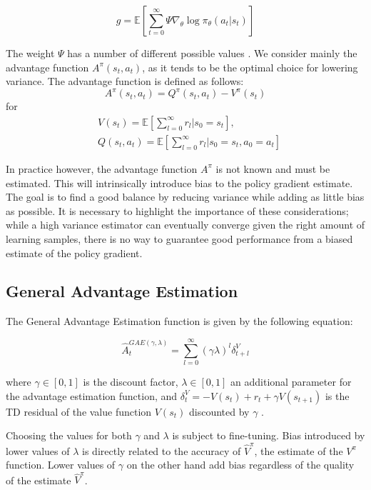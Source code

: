 \[
g = \mathbb{E}\left[\sum_{t=0}^{\infty} \Psi \nabla_{\theta}\log\pi_{\theta}(a_t|s_t)\right]
\]

The weight $\Psi$ has a number of different possible values \cite{schulman2015highdimensional}. We consider mainly the advantage function $A^\pi(s_t, a_t)$, as it tends to be the optimal choice for lowering variance. The advantage function is defined as follows:
\begin{equation}
A^\pi(s_t,a_t) = Q^\pi(s_t, a_t) - V^\pi(s_t)
\end{equation}
for
\begin{align*}
&V(s_t) = \mathbb{E}\left[\sum_{l=0}^{\infty} r_l | s_0 = s_t \right],\\
&Q(s_t, a_t) = \mathbb{E}\left[\sum_{l=0}^{\infty} r_l | s_0 = s_t, a_0 = a_t \right]
\end{align*}


In practice however, the advantage function $A^\pi$ is not known and must be estimated. This will intrinsically introduce bias to the policy gradient estimate. The goal is to find a good balance by reducing variance while adding as little bias as possible. It is necessary to highlight the importance of these considerations; while a high variance estimator can eventually converge given the right amount of learning samples, there is no way to guarantee good performance from a biased estimate of the policy gradient. 

\subsection{General Advantage Estimation}

The General Advantage Estimation\cite{schulman2015highdimensional} function is given by the following equation:

\begin{equation}
\hat{A}_t^{GAE(\gamma, \lambda)} = \sum_{l=0}^{\infty}(\gamma \lambda)^l \delta^V_{t+l}
\end{equation}

where $\gamma \in [0,1]$ is the discount factor, $\lambda \in [0,1]$ an additional parameter for the advantage estimation function, and $\delta^V_t = -V(s_t) + r_t + \gamma V(s_{t+1})$ is the TD residual of the value function $V(s_t)$ discounted by $\gamma$ \cite{sutton1998introduction}.

Choosing the values for both $\gamma$ and $\lambda$ is subject to fine-tuning. Bias introduced by lower values of $\lambda$ is directly related to the accuracy of $\hat{V}^\pi$, the estimate of the $V^\pi$ function. Lower values of $\gamma$ on the other hand add bias regardless of the quality of the estimate $\hat{V}^\pi$.

